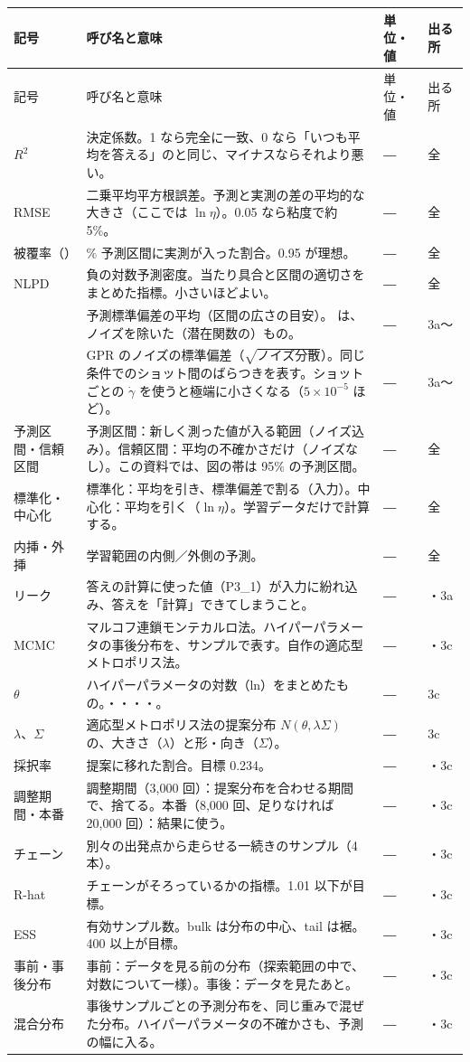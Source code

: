 \documentclass[paper=a4paper,fontsize=10.5pt,line_length=44zw,number_of_lines=38]{jlreq}
\makeatletter
\newcommand{\file}[1]{\texttt{\detokenize{#1}}}
\newcommand{\gd}{\dot{\gamma}}
\newcommand{\PI}{P3\_1}
\newenvironment{symtab}{%
  \begin{longtable}{@{}>{\raggedright\arraybackslash}p{6.5\zw}>{\raggedright\arraybackslash}p{22\zw}>{\raggedright\arraybackslash}p{6\zw}>{\raggedright\arraybackslash}p{4.5\zw}@{}}
  \toprule 記号 & 呼び名と意味 & 単位・値 & 出る所 \\ \midrule \endfirsthead
  \toprule 記号 & 呼び名と意味 & 単位・値 & 出る所 \\ \midrule \endhead
  \bottomrule \endlastfoot}{\end{longtable}}
\makeatother
\begin{document}
\begin{symtab}
$R^2$ & 決定係数。1 なら完全に一致、0 なら「いつも平均を答える」のと同じ、マイナスならそれより悪い。 & ― & 全 \\
RMSE & 二乗平均平方根誤差。予測と実測の差の平均的な大きさ（ここでは $\ln\eta$）。0.05 なら粘度で約 5\%。 & ― & 全 \\
被覆率（\file{coverage95}）& 95\% 予測区間に実測が入った割合。0.95 が理想。 & ― & 全 \\
NLPD & 負の対数予測密度。当たり具合と区間の適切さをまとめた指標。小さいほどよい。 & ― & 全 \\
\file{mean_sd} & 予測標準偏差の平均（区間の広さの目安）。\file{mean_sd_latent} は、ノイズを除いた（潜在関数の）もの。 & ― & 3a〜 \\
\file{noise_sd} & GPR のノイズの標準偏差（$\sqrt{\text{ノイズ分散}}$）。同じ条件でのショット間のばらつきを表す。ショットごとの $\gd$ を使うと極端に小さくなる（$5\times10^{-5}$ ほど）。 & ― & 3a〜 \\
予測区間・信頼区間 & 予測区間：新しく測った値が入る範囲（ノイズ込み）。信頼区間：平均の不確かさだけ（ノイズなし）。この資料では、図の帯は 95\% の予測区間。 & ― & 全 \\
標準化・中心化 & 標準化：平均を引き、標準偏差で割る（入力）。中心化：平均を引く（$\ln\eta$）。学習データだけで計算する。 & ― & 全 \\
内挿・外挿 & 学習範囲の内側／外側の予測。 & ― & 全 \\
リーク & 答えの計算に使った値（\PI）が入力に紛れ込み、答えを「計算」できてしまうこと。 & ― & 2・3a \\
MCMC & マルコフ連鎖モンテカルロ法。ハイパーパラメータの事後分布を、サンプルで表す。自作の適応型メトロポリス法。 & ― & 2・3c \\
$\theta$ & ハイパーパラメータの対数（ln）をまとめたもの。\file{log_c}・\file{log_ls_<入力>}・\file{log_c_lin}・\file{log_sigma0}・\file{log_noise}。 & ― & 3c \\
$\lambda$、$\Sigma$ & 適応型メトロポリス法の提案分布 $N(\theta,\lambda\Sigma)$ の、大きさ（$\lambda$）と形・向き（$\Sigma$）。 & ― & 3c \\
採択率 & 提案に移れた割合。目標 0.234。 & ― & 2・3c \\
調整期間・本番 & 調整期間（3,000 回）：提案分布を合わせる期間で、捨てる。本番（8,000 回、足りなければ 20,000 回）：結果に使う。 & ― & 2・3c \\
チェーン & 別々の出発点から走らせる一続きのサンプル（4 本）。 & ― & 2・3c \\
R-hat & チェーンがそろっているかの指標。1.01 以下が目標。 & ― & 2・3c \\
ESS & 有効サンプル数。bulk は分布の中心、tail は裾。400 以上が目標。 & ― & 2・3c \\
事前・事後分布 & 事前：データを見る前の分布（探索範囲の中で、対数について一様）。事後：データを見たあと。 & ― & 2・3c \\
混合分布 & 事後サンプルごとの予測分布を、同じ重みで混ぜた分布。ハイパーパラメータの不確かさも、予測の幅に入る。 & ― & 2・3c \\
\end{symtab}
\end{document}
